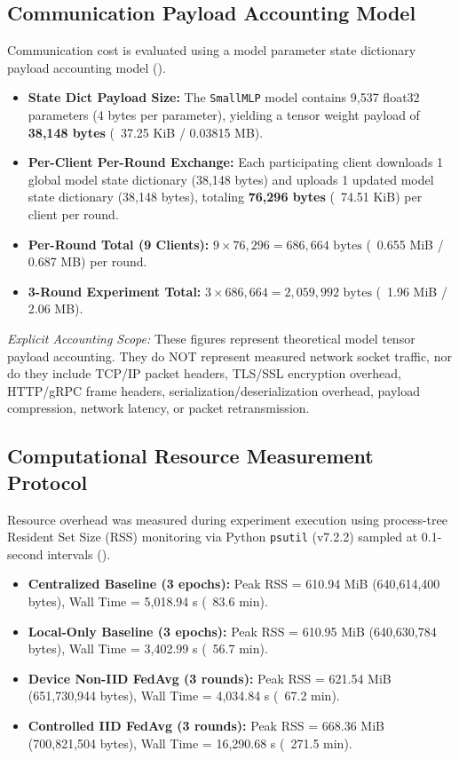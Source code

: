 \documentclass[11pt,a4paper]{article}
\begin{document}
\subsection{Communication Payload Accounting Model}
Communication cost is evaluated using a model parameter state dictionary payload accounting model (\texttt{}).

\begin{itemize}
    \item \textbf{State Dict Payload Size:} The \texttt{SmallMLP} model contains 9,537 float32 parameters (4 bytes per parameter), yielding a tensor weight payload of \textbf{38,148 bytes} (~37.25 KiB / 0.03815 MB).
    \item \textbf{Per-Client Per-Round Exchange:} Each participating client downloads 1 global model state dictionary (38,148 bytes) and uploads 1 updated model state dictionary (38,148 bytes), totaling \textbf{76,296 bytes} (~74.51 KiB) per client per round.
    \item \textbf{Per-Round Total (9 Clients):} $9 \times 76,296 = 686,664 \text{ bytes}$ (~0.655 MiB / 0.687 MB) per round.
    \item \textbf{3-Round Experiment Total:} $3 \times 686,664 = 2,059,992 \text{ bytes}$ (~1.96 MiB / 2.06 MB).
\end{itemize}

\textit{Explicit Accounting Scope:} These figures represent theoretical model tensor payload accounting. They do NOT represent measured network socket traffic, nor do they include TCP/IP packet headers, TLS/SSL encryption overhead, HTTP/gRPC frame headers, serialization/deserialization overhead, payload compression, network latency, or packet retransmission.

\subsection{Computational Resource Measurement Protocol}
Resource overhead was measured during experiment execution using process-tree Resident Set Size (RSS) monitoring via Python \texttt{psutil} (v7.2.2) sampled at 0.1-second intervals (\texttt{}).

\begin{itemize}
    \item \textbf{Centralized Baseline (3 epochs):} Peak RSS = 610.94 MiB (640,614,400 bytes), Wall Time = 5,018.94 s (~83.6 min).
    \item \textbf{Local-Only Baseline (3 epochs):} Peak RSS = 610.95 MiB (640,630,784 bytes), Wall Time = 3,402.99 s (~56.7 min).
    \item \textbf{Device Non-IID FedAvg (3 rounds):} Peak RSS = 621.54 MiB (651,730,944 bytes), Wall Time = 4,034.84 s (~67.2 min).
    \item \textbf{Controlled IID FedAvg (3 rounds):} Peak RSS = 668.36 MiB (700,821,504 bytes), Wall Time = 16,290.68 s (~271.5 min).
\end{itemize}
\end{document}
